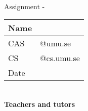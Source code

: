 \begin{titlepage}
	\thispagestyle{empty}
	\noindent {\large \MakeUppercase\university \\
				\instution \\
				\pagetypename \\
			  }

	\begin{center}
	\Large{\textbf{\titleFrontPage}}\\[7pt]

	\large{Assignment \assignmentnumber - \assignmentname}\\[19.7pt]
    
	\begin{tabular}{|p{2cm}|p{8cm}|}
		\hline
		Name &  \name\\\hline
		CAS & \casuser \hfill @umu.se \\\hline
		CS & \csuser \hfill @cs.umu.se \\\hline
		Date & \datemade\\ \hline
	\end{tabular}\\
	\vfill
	\large{\textbf{Teachers and tutors}\\\graders}\\

	\end{center}
	\thispagestyle{empty}
\end{titlepage}
